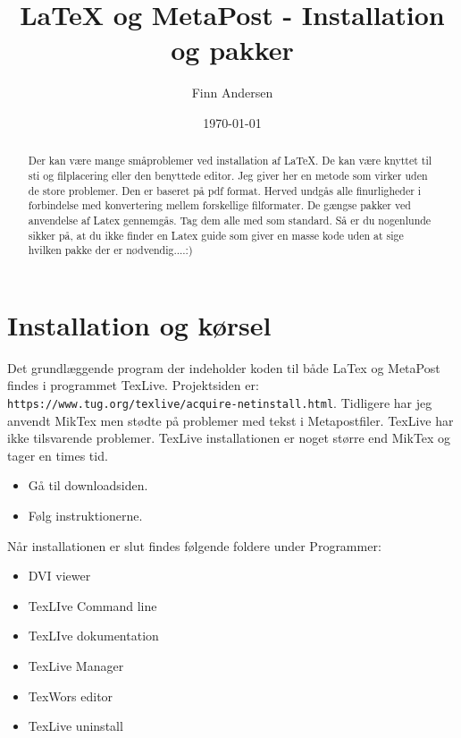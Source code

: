 \documentclass{article}
\begin{document}
\title{\LaTeX{} og MetaPost - Installation og pakker}

\author{Finn Andersen}
\date{\today}
\maketitle

\begin{abstract}
Der kan være mange småproblemer ved installation af \LaTeX{}. De kan være knyttet til sti og filplacering eller den benyttede editor. Jeg giver her en metode som virker uden de store problemer. Den er baseret på pdf format. Herved undgås alle finurligheder i forbindelse med konvertering mellem forskellige filformater. De gængse pakker ved anvendelse af Latex gennemgås. Tag dem alle med som standard. Så er du nogenlunde sikker på, at du ikke finder en Latex guide som giver en masse kode uden at sige hvilken pakke der er nødvendig....:)
\end{abstract}


\section{Installation og kørsel}

Det grundlæggende program der indeholder koden til både LaTex og MetaPost findes i programmet TexLive.
Projektsiden er: \verb"https://www.tug.org/texlive/acquire-netinstall.html". Tidligere har jeg anvendt MikTex men stødte på problemer med tekst i Metapostfiler.
TexLive har ikke tilsvarende problemer. TexLive installationen er noget større end MikTex og tager en times tid. 

\begin{itemize}
\item Gå til downloadsiden.
\item Følg instruktionerne. 
\end{itemize}

Når installationen er slut findes følgende foldere under Programmer:
\begin{itemize}
\item DVI viewer
\item TexLIve Command line
\item TexLIve dokumentation
\item TexLive Manager
\item TexWors editor
\item TexLive uninstall
\end{itemize}
\end{document}
